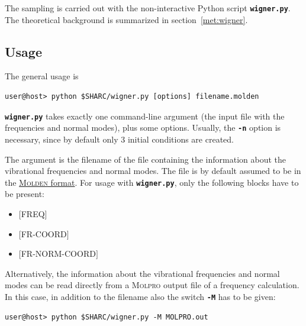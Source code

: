 \documentclass[a4paper,11pt,DIV=15,openany,twoside=false]{scrbook}
\newcommand{\ttt}[1]{\textbf{\texttt{#1}}}
\begin{document}
The sampling is carried out with the non-interactive Python script \ttt{wigner.py}. The theoretical background is summarized in section~\ref{met:wigner}.

\subsection{Usage}

The general usage is 
\begin{verbatim}
user@host> python $SHARC/wigner.py [options] filename.molden
\end{verbatim}
\ttt{wigner.py} takes exactly one command-line argument (the input file with the frequencies and normal modes), plus some options. Usually, the \ttt{-n} option is necessary, since by default only 3 initial conditions are created.

The argument is the filename of the file containing the information about the vibrational frequencies and normal modes. The file is by default assumed to be in the \href{http://www.cmbi.ru.nl/molden/molden_format.html}{\textsc{Molden} format}. For usage with \ttt{wigner.py}, only the following blocks have to be present:

\begin{minipage}{0.9\textwidth}
  \begin{itemize}
    \item $[$FREQ$]$
    \item $[$FR-COORD$]$
    \item $[$FR-NORM-COORD$]$
  \end{itemize}
\end{minipage}

Alternatively, the information about the vibrational frequencies and normal modes can be read directly from a \textsc{Molpro} output file of a frequency calculation. In this case, in addition to the filename also the switch \ttt{-M} has to be given:
\begin{verbatim}
user@host> python $SHARC/wigner.py -M MOLPRO.out
\end{verbatim}
\end{document}
